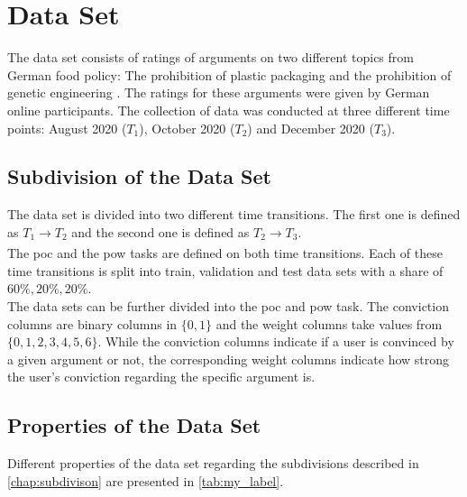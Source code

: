 \section{Data Set}
\label{sec:dataset}
The data set consists of ratings of arguments on two different topics from German food policy: The prohibition of plastic packaging and the prohibition of genetic engineering \cite{brenneis2021will}. The ratings for these arguments were given by German online participants. The collection of data was conducted at three different time points: August 2020 ($T_1$), October 2020 ($T_2$) and December 2020 ($T_3$). 

\subsection{Subdivision of the Data Set}
\label{chap:subdivison}
The data set is divided into two different time transitions. The first one is defined as $T_1 \xrightarrow[]{} T_2$ and the second one is defined as $T_2 \xrightarrow[]{} T_3$.\\
The \acrshort{poc} and the \acrshort{pow} tasks are defined on both time transitions.
Each of these time transitions is split into train, validation and test data sets with a share of $60\%, 20\%, 20\%$.\\
The data sets can be further divided into the \acrshort{poc} and \acrshort{pow} task. The conviction columns are binary columns in $\{0,1\}$ and the weight columns take values from $\{0,1,2,3,4,5,6\}$. While the conviction columns indicate if a user is convinced by a given argument or not, the corresponding weight columns indicate how strong the user's conviction regarding the specific argument is.

\subsection{Properties of the Data Set}
Different properties of the data set regarding the subdivisions described in \autoref{chap:subdivison} are presented in \autoref{tab:my_label}.

